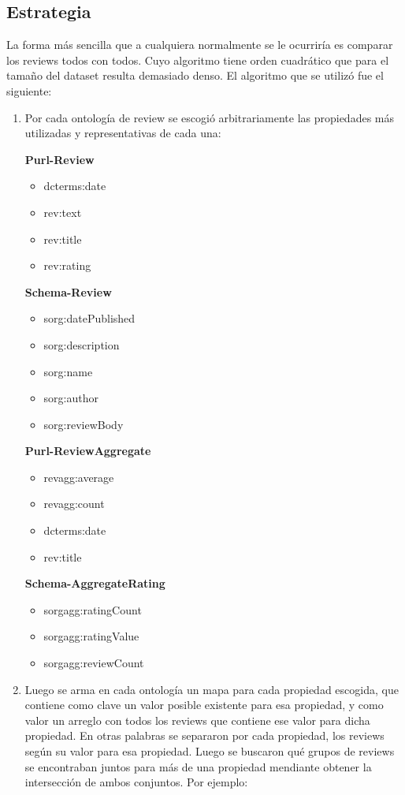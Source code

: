 \subsection*{Estrategia}
La forma más sencilla que a cualquiera normalmente se le ocurriría es comparar los reviews todos con todos. Cuyo algoritmo tiene orden cuadrático que para el tamaño del dataset resulta demasiado denso.
El algoritmo que se utilizó fue el siguiente:
\begin{enumerate}
\item Por cada ontología de review se escogió arbitrariamente las propiedades más utilizadas y representativas de cada una:

\textbf{Purl-Review}
\begin{itemize}
\item dcterms:date
\item rev:text
\item rev:title
\item rev:rating
\end{itemize}


\textbf{Schema-Review}
\begin{itemize}
\item sorg:datePublished
\item sorg:description
\item sorg:name
\item sorg:author
\item sorg:reviewBody
\end{itemize}

\textbf{Purl-ReviewAggregate}

\begin{itemize}
\item revagg:average
\item revagg:count
\item dcterms:date
\item rev:title
\end{itemize}

\textbf{Schema-AggregateRating}

\begin{itemize}
\item sorgagg:ratingCount
\item sorgagg:ratingValue
\item sorgagg:reviewCount
\end{itemize}

\item Luego se arma en cada ontología un mapa para cada propiedad escogida, que contiene como clave un valor posible existente para esa propiedad, y 
como valor un arreglo con todos los reviews que contiene ese valor para dicha propiedad.
En otras palabras se separaron por cada propiedad, los reviews según su valor para esa propiedad.
Luego se buscaron qué grupos de reviews se encontraban juntos para más de una propiedad mendiante obtener la intersección de ambos conjuntos. Por ejemplo:


\end{enumerate}
